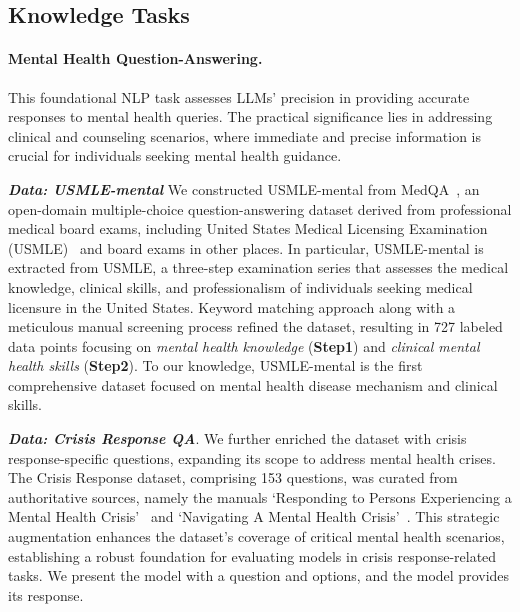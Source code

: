 \subsection{Knowledge Tasks}
\paragraph*{Mental Health Question-Answering.} This foundational NLP task assesses LLMs' precision in providing accurate responses to mental health queries. The practical significance lies in addressing clinical and counseling scenarios, where immediate and precise information is crucial for individuals seeking mental health guidance.

\textbf{\textit{Data: USMLE-mental}}
We constructed USMLE-mental from MedQA~\citep{jin2021disease}, an open-domain multiple-choice question-answering dataset derived from professional medical board exams, including United States Medical Licensing Examination (USMLE)~\citep{usmle} and board exams in other places. In particular, USMLE-mental is extracted from USMLE, a three-step examination series that assesses the medical knowledge, clinical skills, and professionalism of individuals seeking medical licensure in the United States. Keyword matching approach along with a meticulous manual screening process refined the dataset, resulting in 727 labeled data points focusing on \textit{mental health knowledge} (\textbf{Step1}) and \textit{clinical mental health skills} (\textbf{Step2}). To our knowledge, USMLE-mental is the first comprehensive dataset focused on mental health disease mechanism and clinical skills.

\textbf{\textit{Data: Crisis Response QA}}. We further enriched the dataset with crisis response-specific questions, expanding its scope to address mental health crises. The Crisis Response dataset, comprising 153 questions, was curated from authoritative sources, namely the manuals `Responding to Persons Experiencing a Mental Health Crisis'~\citep{responding_manual} and `Navigating A Mental Health Crisis'~\citep{navigating_manual}. This strategic augmentation enhances the dataset's coverage of critical mental health scenarios, establishing a robust foundation for evaluating models in crisis response-related tasks. We present the model with a question and options, and the model provides its response.

